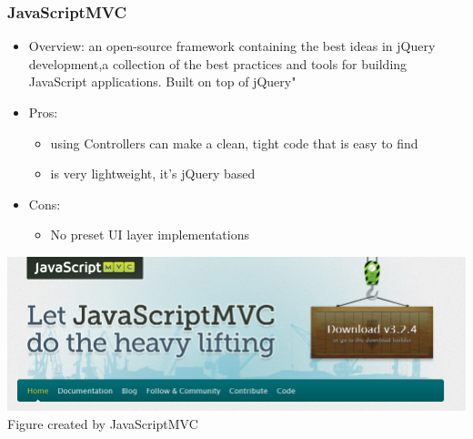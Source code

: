 \documentclass[14pt,a4paper]{extreport}
\begin{document}
		\subsubsection{JavaScriptMVC}
			\begin{itemize}
				\item Overview: an open-source framework containing the best ideas in jQuery development,a collection of the best practices and tools for building JavaScript applications. Built on top of jQuery"
				\item Pros: 
					\begin{itemize}
						\item using Controllers can make a clean, tight code that is easy to find
						\item is very lightweight, it's jQuery based
						
					\end{itemize}
				\item Cons:
					\begin{itemize}
						\item No preset UI layer implementations
						
					\end{itemize}
			\end{itemize}
			\begin{center}
			\includegraphics[scale=0.6]{javamvc.png}
			Figure created by JavaScriptMVC
			\end{center}
\end{document}
